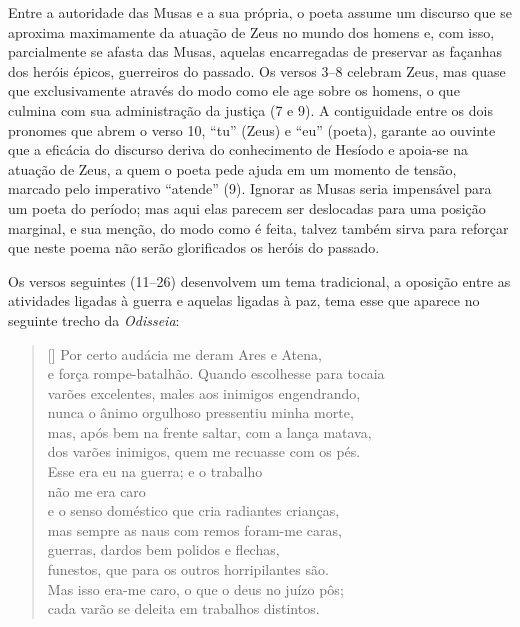 Entre a autoridade das Musas e a sua própria, o poeta assume um discurso
que se aproxima maximamente da atuação de Zeus no mundo dos homens e,
com isso, parcialmente se afasta das Musas, aquelas encarregadas de
preservar as façanhas dos heróis épicos, guerreiros do passado. Os versos 3--8 
celebram Zeus, mas quase que exclusivamente através do modo como 
ele age sobre os homens, o que culmina com sua administração da justiça (7 e 9). 
A contiguidade entre os dois pronomes que abrem o verso 10, “tu” (Zeus) e 
“eu” (poeta), garante ao ouvinte que a eficácia do discurso deriva do conhecimento 
de Hesíodo e apoia-se na atuação de Zeus, a quem o poeta pede ajuda em um momento 
de tensão, marcado pelo imperativo “atende” (9). Ignorar as Musas seria impensável 
para um poeta do período; mas aqui elas parecem ser deslocadas para uma posição
marginal, e sua menção, do modo como é feita, talvez também sirva para
reforçar que neste poema não serão glorificados os heróis do passado.

Os versos seguintes (11--26) desenvolvem um tema tradicional, a oposição
entre as atividades ligadas à guerra e aquelas ligadas à paz, tema esse
que aparece no seguinte trecho da \textit{Odisseia}: 



\begin{verse}[\versewidth]
  Por certo audácia me deram Ares e Atena,\\
  e força rompe-batalhão. Quando escolhesse para tocaia\\
  varões excelentes, males aos inimigos engendrando,\\
  nunca o ânimo orgulhoso pressentiu minha morte,\\
  mas, após bem na frente saltar, com a lança matava,\\
  dos varões inimigos, quem me recuasse com os pés.\\
  Esse era eu na guerra; e o trabalho\\
  não me era caro\\
  e o senso doméstico que cria radiantes crianças,\\
  mas sempre as naus com remos foram-me caras,\\
  guerras, dardos bem polidos e flechas,\\
  funestos, que para os outros horripilantes são.\\
  Mas isso era-me caro, o que o deus no juízo pôs;\\
  cada varão se deleita em trabalhos distintos.
\end{verse}


